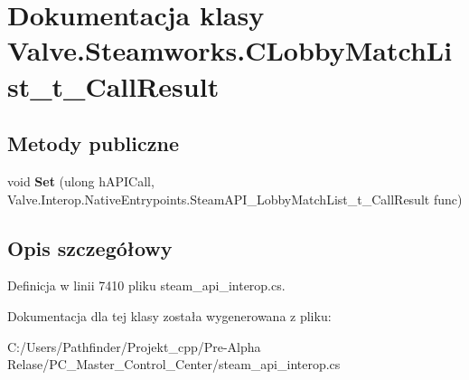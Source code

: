 \hypertarget{class_valve_1_1_steamworks_1_1_c_lobby_match_list__t___call_result}{}\section{Dokumentacja klasy Valve.\+Steamworks.\+C\+Lobby\+Match\+List\+\_\+t\+\_\+\+Call\+Result}
\label{class_valve_1_1_steamworks_1_1_c_lobby_match_list__t___call_result}
\subsection*{Metody publiczne}
\begin{DoxyCompactItemize}
\item 
\mbox{\label{class_valve_1_1_steamworks_1_1_c_lobby_match_list__t___call_result_a2bdf90a3bccffc8f9297e4bb4982769e}} 
void {\bfseries Set} (ulong h\+A\+P\+I\+Call, Valve.\+Interop.\+Native\+Entrypoints.\+Steam\+A\+P\+I\+\_\+\+Lobby\+Match\+List\+\_\+t\+\_\+\+Call\+Result func)
\end{DoxyCompactItemize}


\subsection{Opis szczegółowy}


Definicja w linii 7410 pliku steam\+\_\+api\+\_\+interop.\+cs.



Dokumentacja dla tej klasy została wygenerowana z pliku\+:\begin{DoxyCompactItemize}
\item 
C\+:/\+Users/\+Pathfinder/\+Projekt\+\_\+cpp/\+Pre-\/\+Alpha Relase/\+P\+C\+\_\+\+Master\+\_\+\+Control\+\_\+\+Center/steam\+\_\+api\+\_\+interop.\+cs\end{DoxyCompactItemize}
